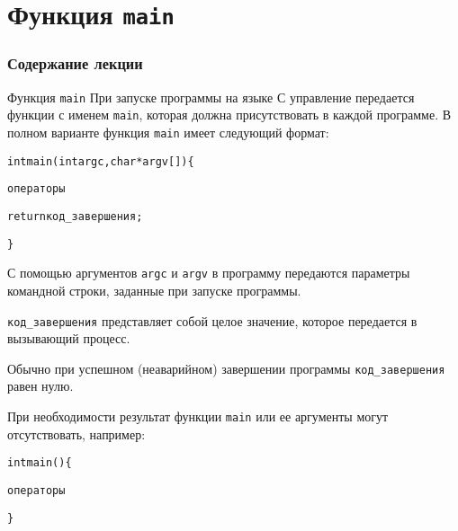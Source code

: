 \documentclass{beamer}
\begin{document}
\section{Функция \texttt{main}}
    
\begin{frame}
  \frametitle{Содержание лекции}
  \tableofcontents[current]
\end{frame}

\begin{frame}{Функция \texttt{main}}
    При запуске программы на языке С управление передается функции с именем \texttt{main}, которая должна присутствовать в каждой программе. В полном варианте функция \texttt{main} имеет следующий формат:
    \begin{alltt}
        int main(int argc, char *argv[])\{
        
        \qquad операторы
        
        \qquad return код\_завершения;
        
        \}
    \end{alltt}
    
    С помощью аргументов \texttt{argc} и \texttt{argv} в программу передаются параметры командной строки, заданные при запуске программы.
    
    \medskip
    \texttt{код\_завершения} представляет собой целое значение, которое передается в вызывающий процесс.
    
    \medskip Обычно при успешном (неаварийном) завершении программы \texttt{код\_завершения} равен нулю.
    
    \medskip
    При необходимости результат функции \texttt{main} или ее аргументы могут отсутствовать, например:
    \begin{alltt}
        int main()\{
        
        \qquad операторы
        
        \}
    \end{alltt}
\end{frame}
\end{document}
